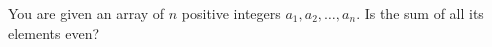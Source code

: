 You are given an array of $n$ positive integers $a_1, a_2, \ldots, a_n$.
Is the sum of all its elements even?
